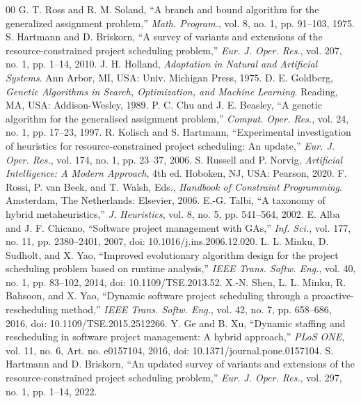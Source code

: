 \documentclass{IEEEtran}
\begin{document}
\begin{thebibliography}{00}
 G. T. Ross and R. M. Soland, ``A branch and bound algorithm for the generalized assignment problem,'' \textit{Math. Program.}, vol. 8, no. 1, pp. 91--103, 1975.
 S. Hartmann and D. Briskorn, ``A survey of variants and extensions of the resource-constrained project scheduling problem,'' \textit{Eur. J. Oper. Res.}, vol. 207, no. 1, pp. 1--14, 2010.
 J. H. Holland, \textit{Adaptation in Natural and Artificial Systems}. Ann Arbor, MI, USA: Univ. Michigan Press, 1975.
 D. E. Goldberg, \textit{Genetic Algorithms in Search, Optimization, and Machine Learning}. Reading, MA, USA: Addison-Wesley, 1989.
 P. C. Chu and J. E. Beasley, ``A genetic algorithm for the generalised assignment problem,'' \textit{Comput. Oper. Res.}, vol. 24, no. 1, pp. 17--23, 1997.
 R. Kolisch and S. Hartmann, ``Experimental investigation of heuristics for resource-constrained project scheduling: An update,'' \textit{Eur. J. Oper. Res.}, vol. 174, no. 1, pp. 23--37, 2006.
 S. Russell and P. Norvig, \textit{Artificial Intelligence: A Modern Approach}, 4th ed. Hoboken, NJ, USA: Pearson, 2020.
 F. Rossi, P. van Beek, and T. Walsh, Eds., \textit{Handbook of Constraint Programming}. Amsterdam, The Netherlands: Elsevier, 2006.
 E.-G. Talbi, ``A taxonomy of hybrid metaheuristics,'' \textit{J. Heuristics}, vol. 8, no. 5, pp. 541--564, 2002.
 E. Alba and J. F. Chicano, ``Software project management with GAs,'' \textit{Inf. Sci.}, vol. 177, no. 11, pp. 2380--2401, 2007, doi: 10.1016/j.ins.2006.12.020.
 L. L. Minku, D. Sudholt, and X. Yao, ``Improved evolutionary algorithm design for the project scheduling problem based on runtime analysis,'' \textit{IEEE Trans. Softw. Eng.}, vol. 40, no. 1, pp. 83--102, 2014, doi: 10.1109/TSE.2013.52.
 X.-N. Shen, L. L. Minku, R. Bahsoon, and X. Yao, ``Dynamic software project scheduling through a proactive-rescheduling method,'' \textit{IEEE Trans. Softw. Eng.}, vol. 42, no. 7, pp. 658--686, 2016, doi: 10.1109/TSE.2015.2512266.
 Y. Ge and B. Xu, ``Dynamic staffing and rescheduling in software project management: A hybrid approach,'' \textit{PLoS ONE}, vol. 11, no. 6, Art. no. e0157104, 2016, doi: 10.1371/journal.pone.0157104.
 S. Hartmann and D. Briskorn, ``An updated survey of variants and extensions of the resource-constrained project scheduling problem,'' \textit{Eur. J. Oper. Res.}, vol. 297, no. 1, pp. 1--14, 2022.

\end{thebibliography}
\end{document}
